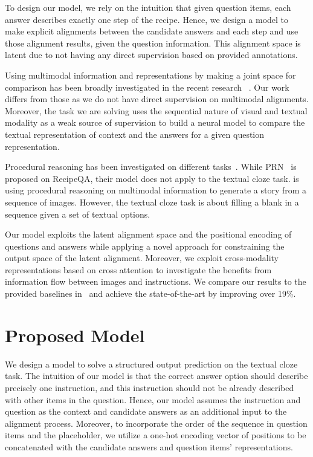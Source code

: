 \documentclass[11pt,a4paper]{article}
\begin{document}
To design our model, we rely on the intuition that given question items, each answer describes exactly one step of the recipe.
Hence, we design a model to make explicit alignments between the candidate answers and each step and use those alignment results, given the question information. This alignment space is latent due to not having any direct supervision based on provided annotations. 

Using multimodal information and representations by making a joint space for comparison has been broadly investigated in the recent research ~\cite{hessel-lee-mimno-2019unsupervised,UnifiedVisual,li2019visualbert,su2020vl-bert,yu2019multimodal,fan2018stacked,tan-bansal-2019-lxmert,nam2017dual}. Our work differs from those as we do not have direct supervision on multimodal alignments. Moreover, the task we are solving uses  the sequential nature of visual and textual modality as a weak source of supervision to build a neural model to compare the textual representation of context and the answers for a given question representation.

Procedural reasoning has been investigated on different tasks~\cite{amac-etal-2019-procedural,CRCN}. While PRN~\cite{amac-etal-2019-procedural} is proposed on RecipeQA, their model does not apply to the textual cloze task. \cite{CRCN} is using procedural reasoning on multimodal information to generate a story from a sequence of images. However, the textual cloze task is about filling a blank in a sequence given a set of textual options.



Our model exploits the latent alignment space and the positional encoding of questions and answers while applying a novel approach for constraining the output space of the latent alignment. Moreover, we exploit cross-modality representations based on cross attention to investigate the benefits from information flow between images and instructions. We compare our results to the provided baselines in~\cite{yagcioglu2018recipeqa} and achieve the state-of-the-art by improving over 19\%. 





\section{Proposed Model}
We design a model to solve a structured output prediction on the textual cloze task. The intuition of our model is that the correct answer option should describe precisely one instruction, and this instruction should not be already described with  other items in the question. Hence, our model assumes the instruction and question as the context and candidate answers as an additional input to the alignment process. 
Moreover, to incorporate the order of the sequence in question items and the placeholder, we utilize a one-hot encoding vector of positions to be concatenated with the candidate answers and question items' representations.
\end{document}

